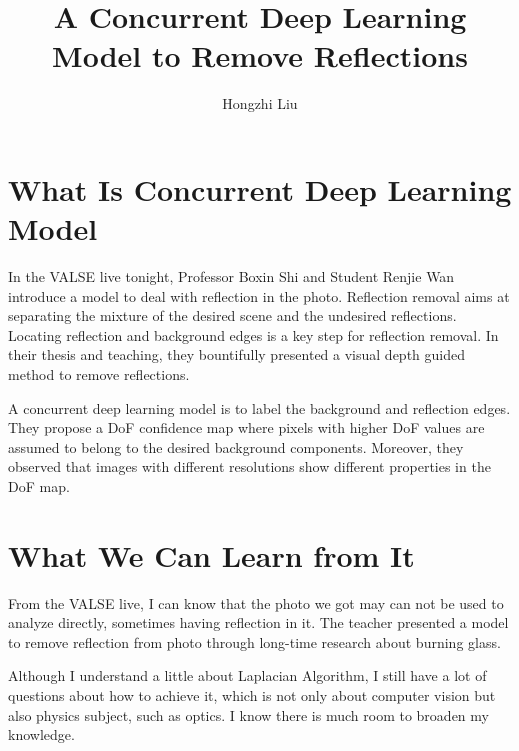 \documentclass{article}
\author{Hongzhi Liu}
\title{A Concurrent Deep Learning Model to Remove Reflections}
\begin{document}
  \maketitle
  \section{What Is Concurrent Deep Learning Model}
  \par
  In the VALSE live tonight, Professor Boxin Shi and Student Renjie Wan introduce a model to deal with reflection in the photo. Reflection removal aims at separating the mixture of the desired scene and the undesired reflections. Locating reflection and background edges is a key step for reflection removal. In their thesis and teaching, they bountifully presented a visual depth guided method to remove reflections.

  A concurrent deep learning model is to label the background and reflection edges. They propose a DoF confidence map where pixels with higher DoF values are assumed to belong to the desired background components. Moreover, they observed that images with different resolutions show different properties in the DoF map.

  \section{What We Can Learn from It}
  \par
  From the VALSE live, I can know that the photo we got may can not be used to analyze directly, sometimes having reflection in it. The teacher presented a model to remove reflection from photo through long-time research about burning glass.

  Although I understand a little about Laplacian Algorithm, I still have a lot of questions about how to achieve it, which is not only about computer vision but also physics subject, such as optics. I know there is much room to broaden my knowledge.
\end{document}
